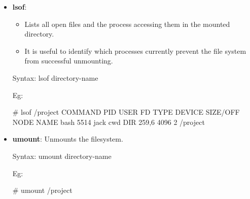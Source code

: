 \setlength{\columnsep}{3pt}
\begin{flushleft}
	

	\begin{itemize}
		\item \textbf{lsof}: 
		\begin{itemize}
			\item Lists all open files and the process accessing them in the mounted directory.
			\item It is useful to identify which processes currently prevent the file system from successful unmounting.
		\end{itemize}
		 
		\begin{tcolorbox}[breakable,notitle,boxrule=-0pt,colback=pink,colframe=pink]
			\color{black}
			\font=9pt
			Syntax: lsof directory-name
			\font=4pt
		\end{tcolorbox}
		Eg:	
		\bigskip
		\begin{tcolorbox}[breakable,notitle,boxrule=-0pt,colback=black,colframe=black]
			\color{green}
			\font=9pt
			\# lsof /project
			\newline
			\color{white}
			COMMAND  PID USER   FD   TYPE DEVICE SIZE/OFF NODE NAME
			\newline
			bash    5514 jack  cwd    DIR  259,6     4096    2 /project
			\font=4pt
		\end{tcolorbox}
		\bigskip
		\bigskip
		
		\item \textbf{umount}: Unmounts the filesystem.
		\begin{tcolorbox}[breakable,notitle,boxrule=-0pt,colback=pink,colframe=pink]
			\color{black}
			\font=9pt
			Syntax: umount directory-name
			\font=4pt
		\end{tcolorbox}
		Eg:	
		\bigskip
		\begin{tcolorbox}[breakable,notitle,boxrule=-0pt,colback=black,colframe=black]
			\color{green}
			\font=9pt
			\# umount /project
			\font=4pt
		\end{tcolorbox}
	\end{itemize}	
	
	
\end{flushleft}

\newpage

